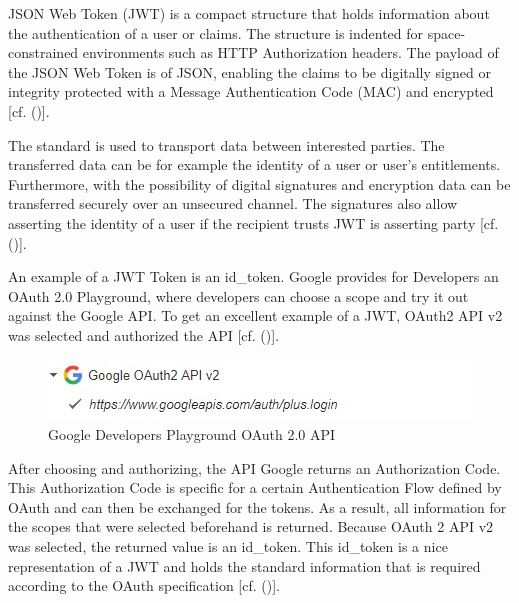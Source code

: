 {JSON Web Token (JWT) is a compact structure that holds information about the authentication of a user or claims. The structure is indented for space-constrained environments such as HTTP Authorization headers. The payload of the JSON Web Token is of JSON, enabling the claims to be digitally signed or integrity protected with a Message Authentication Code (MAC) and encrypted [cf. (\cite{JWT:IETF:Jones:2015})].

The standard is used to transport data between interested parties. The transferred data can be for example the identity of a user or user’s entitlements. Furthermore, with the possibility of digital signatures and encryption data can be transferred securely over an unsecured channel. The signatures also allow asserting the identity of a user if the recipient trusts JWT is asserting party [cf. (\cite{Siriwardena:JWTJWSJWE:2016})].

An example of a JWT Token is an id\_token. Google provides for Developers an OAuth 2.0 Playground, where developers can choose a scope and try it out against the Google API. To get an excellent example of a JWT, OAuth2 API v2 was selected and authorized the API [cf. (\cite{Google:2018:OAuthPlayground})].


\begin{figure}[h]
	\centering
	\includegraphics[width=0.8\linewidth]{images/googleOAuthPlaygroundOAuthAPI}
	\caption[OAuth API]{Google Developers Playground OAuth 2.0 API}
	\label{fig:googleoauthplaygroundoauthapi}
\end{figure}

After choosing and authorizing, the API Google returns an Authorization Code. This Authorization Code is specific for a certain Authentication Flow defined by OAuth and can then be exchanged for the tokens. As a result, all information for the scopes that were selected beforehand is returned. Because OAuth 2 API v2 was selected, the returned value is an id\_token. This id\_token is a nice representation of a JWT and holds the standard information that is required according to the OAuth specification  [cf. (\cite{Google:2018:OAuthPlayground})].



}
